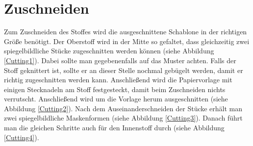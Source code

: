 \documentclass[12pt,parskip=full]{scrartcl}
\begin{document}
\section{Zuschneiden}
Zum Zuschneiden des Stoffes wird die ausgeschnittene Schablone in der richtigen Größe benötigt. Der Oberstoff wird in der Mitte so gefaltet, dass gleichzeitig zwei spiegelbildliche Stücke zugeschnitten werden können (siehe Abbildung \ref{Cutting1}). Dabei sollte man gegebenenfalls auf das Muster achten. Falls der Stoff geknittert ist, sollte er an dieser Stelle nochmal gebügelt werden, damit er richtig zugeschnitten werden kann. Anschließend wird die Papiervorlage mit einigen Stecknadeln am Stoff festgesteckt, damit beim Zuschneiden nichts verrutscht. Anschließend wird um die Vorlage herum ausgeschnitten (siehe Abbildung \ref{Cutting2}). Nach dem Auseinanderschneiden der Stücke erhält man zwei spiegelbildliche Maskenformen (siehe Abbildung \ref{Cutting3}). Danach führt man die gleichen Schritte auch für den Innenstoff durch (siehe Abbildung \ref{Cutting4}).
\end{document}
